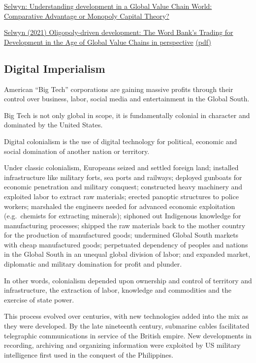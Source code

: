 \documentclass[
]{book}
\begin{document}
\href{https://developingeconomics.org/2021/04/22/understanding-development-in-a-global-value-chain-world-comparative-advantage-or-monopoly-capital-theory/amp/?__twitter_impression=true}{Selwyn: Understanding development in a Global Value Chain World: Comparative Advantage or Monopoly Capital Theory?}

\href{https://journals.sagepub.com/doi/full/10.1177/1024529421995351}{Selwyn (2021) Oligopoly-driven development: The Word Bank's Trading for Development in the Age of Global Value Chains in perspective}
\href{pdf/Selwyn_2021_Oligopoly-driven_Development.pdf}{(pdf)}

\hypertarget{digital-imperialism}{%
\subsection{Digital Imperialism}\label{digital-imperialism}}

American ``Big Tech'' corporations are gaining massive profits through their control over business, labor, social media and entertainment in the Global South.

Big Tech is not only global in scope, it is fundamentally colonial in character and dominated by the United States.

Digital colonialism is the use of digital technology for political, economic and social domination of another nation or territory.

Under classic colonialism, Europeans seized and settled foreign land; installed infrastructure like military forts, sea ports and railways; deployed gunboats for economic penetration and military conquest; constructed heavy machinery and exploited labor to extract raw materials; erected panoptic structures to police workers; marshaled the engineers needed for advanced economic exploitation (e.g.~chemists for extracting minerals); siphoned out Indigenous knowledge for manufacturing processes; shipped the raw materials back to the mother country for the production of manufactured goods; undermined Global South markets with cheap manufactured goods; perpetuated dependency of peoples and nations in the Global South in an unequal global division of labor; and expanded market, diplomatic and military domination for profit and plunder.

In other words, colonialism depended upon ownership and control of territory and infrastructure, the extraction of labor, knowledge and commodities and the exercise of state power.

This process evolved over centuries, with new technologies added into the mix as they were developed. By the late nineteenth century, submarine cables facilitated telegraphic communications in service of the British empire. New developments in recording, archiving and organizing information were exploited by US military intelligence first used in the conquest of the Philippines.
\end{document}
